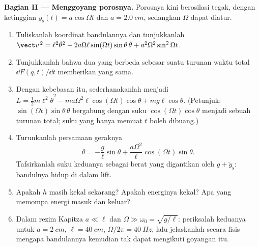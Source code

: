 \begin{problem}
\medskip\noindent\textbf{Bagian II --- Menggoyang porosnya.}
Porosnya kini berosilasi tegak, dengan ketinggian $y_{\text{s}}(t) =
a\cos\Omega t$ dan $a = \qty{2.0}{cm}$, sedangkan $\Omega$ dapat diatur.
\begin{enumerate}[resume]
  \item Tuliskanlah koordinat bandulannya dan tunjukkanlah
        $\vect v^{\,2} = \ell^2\dot\theta^2 -
        2a\Omega\ell\sin(\Omega t)\sin\theta\,\dot\theta +
        a^2\Omega^2\sin^2\Omega t$.
  \item Tunjukkanlah bahwa dua  yang berbeda sebesar suatu
        turunan waktu total $\dd F(q,t)/\dd t$ memberikan  yang sama.
  \item Dengan kebebasan itu, sederhanakanlah  menjadi $L = \tfrac12 m
        \ell^2\dot\theta^2 - ma\Omega^2\ell\cos(\Omega t)\cos\theta +
        mg\ell\cos\theta$. (Petunjuk: $\sin(\Omega t)\sin\theta\,\dot\theta$
        bergabung dengan suku $\cos(\Omega t)\cos\theta$ menjadi sebuah
        turunan total; suku yang hanya memuat $t$ boleh dibuang.)
  \item Turunkanlah persamaan geraknya
        \[
        \ddot\theta = -\frac{g}{\ell}\sin\theta
         + \frac{a\Omega^2}{\ell}\cos(\Omega t)\sin\theta .
        \]
        Tafsirkanlah suku keduanya sebagai berat yang digantikan oleh $g +
        \ddot y_{\text{s}}$: bandulnya hidup di dalam lift.
  \item Apakah  $h$ masih kekal sekarang? Apakah energinya
        kekal? Apa yang memompa energi masuk dan keluar?
  \item Dalam rezim Kapitza $a \ll \ell$ dan $\Omega \gg \omega_0 =
        \sqrt{g/\ell}$: periksalah keduanya untuk $a = \qty{2}{cm}$, $\ell =
        \qty{40}{cm}$, $\Omega/2\pi = \qty{40}{Hz}$, lalu jelaskanlah
        secara fisis mengapa bandulannya kemudian tak dapat mengikuti
        goyangan itu.
\end{enumerate}


\end{problem}
